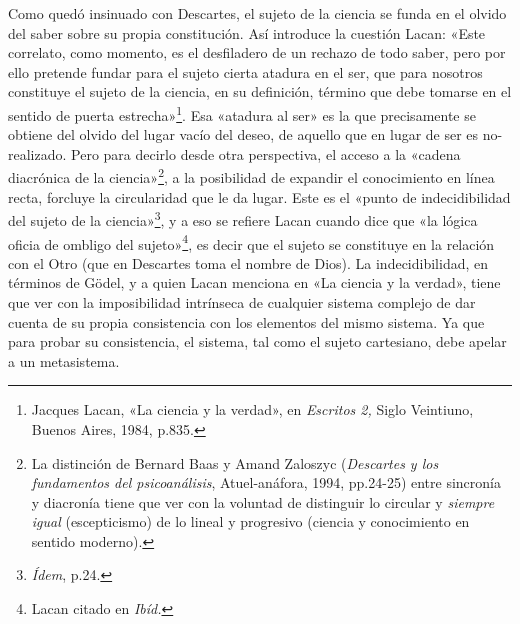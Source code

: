 Como quedó insinuado con Descartes, el sujeto de la ciencia se funda en el olvido del saber sobre su propia constitución. Así introduce la cuestión Lacan: «Este correlato, como momento, es el desfiladero de un rechazo de todo saber, pero por ello pretende fundar para el sujeto cierta atadura en el ser, que para nosotros constituye el sujeto de la ciencia, en su definición, término que debe tomarse en el sentido de puerta estrecha»\footnote{Jacques Lacan, «La ciencia y la verdad», en \emph{Escritos 2,} Siglo Veintiuno, Buenos Aires, 1984, p.835.}. Esa «atadura al ser» es la que precisamente se obtiene del olvido del lugar vacío del deseo, de aquello que en lugar de ser es no-realizado. Pero para decirlo desde otra perspectiva, el acceso a la «cadena diacrónica de la ciencia»\footnote{La distinción de Bernard Baas y Amand Zaloszyc (\emph{Descartes y los fundamentos del psicoanálisis}, Atuel-anáfora, 1994, pp.24-25) entre sincronía y diacronía tiene que ver con la voluntad de distinguir lo circular y \emph{siempre igual} (escepticismo) de lo lineal y progresivo (ciencia y conocimiento en sentido moderno).}, a la posibilidad de expandir el conocimiento en línea recta, forcluye la circularidad que le da lugar. Este es el «punto de indecidibilidad del sujeto de la ciencia»\footnote{\emph{Ídem}, p.24.}, y a eso se refiere Lacan cuando dice que «la lógica oficia de ombligo del sujeto»\footnote{Lacan citado en \emph{Ibíd.}}, es decir que el sujeto se constituye en la relación con el Otro (que en Descartes toma el nombre de Dios). La indecidibilidad, en términos de Gödel, y a quien Lacan menciona en «La ciencia y la verdad», tiene que ver con la imposibilidad intrínseca de cualquier sistema complejo de dar cuenta de su propia consistencia con los elementos del mismo sistema. Ya que para probar su consistencia, el sistema, tal como el sujeto cartesiano, debe apelar a un metasistema.

